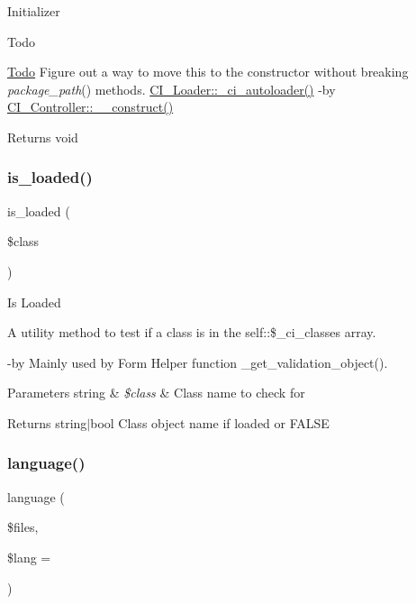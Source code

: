 Initializer

\begin{DoxyRefDesc}{Todo}
\item[\mbox{\hyperlink{todo__todo000001}{Todo}}]Figure out a way to move this to the constructor without breaking {\itshape package\+\_\+path}() methods.  \mbox{\hyperlink{class_c_i___loader_a93471c04ea0689dcf8faa5903d201efe}{C\+I\+\_\+\+Loader\+::\+\_\+ci\+\_\+autoloader()}} -\/by \mbox{\hyperlink{class_c_i___controller_a095c5d389db211932136b53f25f39685}{C\+I\+\_\+\+Controller\+::\+\_\+\+\_\+construct()}} \end{DoxyRefDesc}
\begin{DoxyReturn}{Returns}
void 
\end{DoxyReturn}
\mbox{\label{class_c_i___loader_a57ba1b43ec1d58c07a2d1e8cd00b9658}} 
\subsubsection{\texorpdfstring{is\+\_\+loaded()}{is\_loaded()}}
{\footnotesize\ttfamily is\+\_\+loaded (\begin{DoxyParamCaption}\item[{}]{\$class }\end{DoxyParamCaption})}

Is Loaded

A utility method to test if a class is in the self\+::\$\+\_\+ci\+\_\+classes array.

-\/by Mainly used by Form Helper function \+\_\+get\+\_\+validation\+\_\+object().


\begin{DoxyParams}[1]{Parameters}
string & {\em \$class} & Class name to check for \\
\hline
\end{DoxyParams}
\begin{DoxyReturn}{Returns}
string$\vert$bool Class object name if loaded or F\+A\+L\+SE 
\end{DoxyReturn}
\mbox{\label{class_c_i___loader_ae3e44c33f5f085ad8d6c556ede1385d8}} 
\subsubsection{\texorpdfstring{language()}{language()}}
{\footnotesize\ttfamily language (\begin{DoxyParamCaption}\item[{}]{\$files,  }\item[{}]{\$lang = {\ttfamily \textquotesingle{}\textquotesingle{}} }\end{DoxyParamCaption})}


